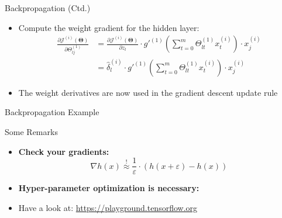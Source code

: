 \begin{frame}{Backpropagation (Ctd.)}{}\important
	\begin{itemize}
		\item Compute the weight gradient for the hidden layer:
		\begin{align*}
			\frac{\partial \mathcal{J}^{(i)}(\bm{\Theta})}{\partial \Theta_{lj}^{(1)}}
				&= \frac{\partial \mathcal{J}^{(i)}(\bm{\Theta})}{\partial z_l} \cdot g'^{(1)} \left( \sum_{t=0}^m \Theta_{lt}^{(1)} x_t^{(i)} \right) \cdot x_j^{(i)} \\
				&= \widehat{\delta}_l^{(i)} \cdot g'^{(1)} \left( \sum_{t=0}^m \Theta_{lt}^{(1)} x_t^{(i)} \right) \cdot x_j^{(i)}
		\end{align*}
		\item The weight derivatives are now used in the gradient descent update rule
	\end{itemize}
\end{frame}


\begin{frame}{Backpropagation Example}{}
	\vfill
	\begin{center}
		\Huge {}
	\end{center}
	\vfill
\end{frame}


\begin{frame}{Some Remarks}{}
	\begin{itemize}
		\item \textbf{Check your gradients:}
		\begin{equation*}
			\nabla h(x) \overset{!}{\approx} \frac{1}{\varepsilon} \cdot (h(x + \varepsilon) - h(x))
		\end{equation*}
		\item \textbf{Hyper-parameter optimization is necessary:}
	\end{itemize}
	\begin{itemize}
		\item Have a look at: \url{https://playground.tensorflow.org}
	\end{itemize}
\end{frame}


